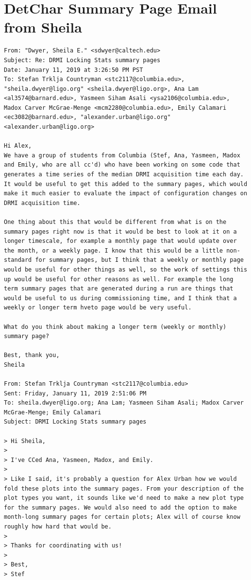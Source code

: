 \documentclass{article}
\begin{document}
\section{DetChar Summary Page Email from Sheila}
\label{sec:summary-page-email}
\lstset{language=}
\begin{lstlisting}
From: "Dwyer, Sheila E." <sdwyer@caltech.edu>
Subject: Re: DRMI Locking Stats summary pages
Date: January 11, 2019 at 3:26:50 PM PST
To: Stefan Trklja Countryman <stc2117@columbia.edu>, "sheila.dwyer@ligo.org" <sheila.dwyer@ligo.org>, Ana Lam <al3574@barnard.edu>, Yasmeen Siham Asali <ysa2106@columbia.edu>, Madox Carver McGrae-Menge <mcm2280@columbia.edu>, Emily Calamari <ec3082@barnard.edu>, "alexander.urban@ligo.org" <alexander.urban@ligo.org>

Hi Alex,
We have a group of students from Columbia (Stef, Ana, Yasmeen, Madox and Emily, who are all cc'd) who have been working on some code that generates a time series of the median DRMI acquisition time each day. It would be useful to get this added to the summary pages, which would make it much easier to evaluate the impact of configuration changes on DRMI acquisition time.

One thing about this that would be different from what is on the summary pages right now is that it would be best to look at it on a longer timescale, for example a monthly page that would update over the month, or a weekly page. I know that this would be a little non-standard for summary pages, but I think that a weekly or monthly page would be useful for other things as well, so the work of settings this up would be useful for other reasons as well. For example the long term summary pages that are generated during a run are things that would be useful to us during commissioning time, and I think that a weekly or longer term hveto page would be very useful.

What do you think about making a longer term (weekly or monthly) summary page?

Best, thank you,
Sheila

From: Stefan Trklja Countryman <stc2117@columbia.edu>
Sent: Friday, January 11, 2019 2:51:06 PM
To: sheila.dwyer@ligo.org; Ana Lam; Yasmeen Siham Asali; Madox Carver McGrae-Menge; Emily Calamari
Subject: DRMI Locking Stats summary pages

> Hi Sheila,
> 
> I've CCed Ana, Yasmeen, Madox, and Emily.
> 
> Like I said, it's probably a question for Alex Urban how we would fold these plots into the summary pages. From your description of the plot types you want, it sounds like we'd need to make a new plot type for the summary pages. We would also need to add the option to make month-long summary pages for certain plots; Alex will of course know roughly how hard that would be.
> 
> Thanks for coordinating with us!
> 
> Best,
> Stef
\end{lstlisting}
\end{document}
